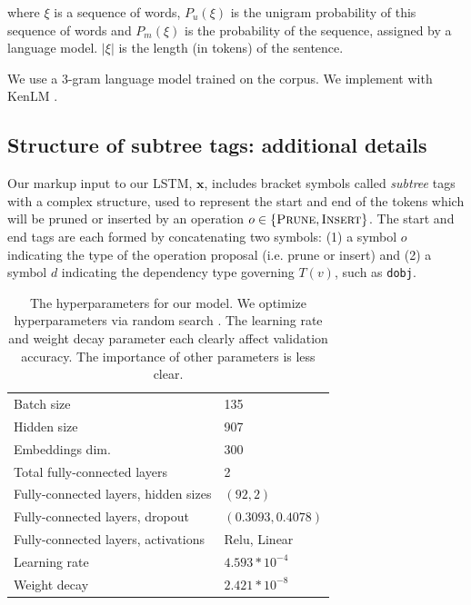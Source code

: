 where $\xi$ is a sequence of words, $P_u(\xi)$ is the unigram probability of this sequence of words and $P_m(\xi)$ is the probability of the sequence, assigned by a language model.  $|\xi|$ is the length (in tokens) of the sentence.

We use a 3-gram language model trained on the \citet{filippova2013overcoming} corpus. We implement with KenLM \cite{Heafield-kenlm}.

\subsection{Structure of subtree tags: additional details}\label{s:subtree}

Our markup input to our LSTM, $\bm{x}$, includes bracket symbols called \textit{subtree} tags with a complex structure, used to represent the start and end of the tokens which will be pruned or inserted by an operation $o \in \{ \textsc{Prune},\textsc{Insert}\}$. The start and end tags are each formed by concatenating two symbols: (1) a symbol $o$ indicating the type of the operation proposal (i.e. prune or insert) and (2) a symbol $d$ indicating the dependency type governing $T(v)$, such as \texttt{dobj}. 

\begin{table}[htb!]
\begin{tabular}{@{}ll@{}}
\toprule
Batch size         & 135                      \\ 
Hidden size        & 907                        \\
Embeddings dim.    & 300                      \\
Total fully-connected layers & 2                        \\
Fully-connected layers, hidden sizes & $(92, 2)$ \\
Fully-connected layers, dropout & $(0.3093, 0.4078)$ \\
Fully-connected layers, activations        & Relu, Linear             \\
Learning rate      & $4.593 * 10^{-4}$   \\
Weight decay       & $2.421 * 10^{-8}$   \\ \bottomrule
\end{tabular}
\caption{The hyperparameters for our model. We optimize hyperparameters via random search \cite{Bergstra2012RandomSF}. The learning rate and weight decay parameter each clearly affect validation accuracy. The importance of other parameters is less clear. } 
\end{table}

